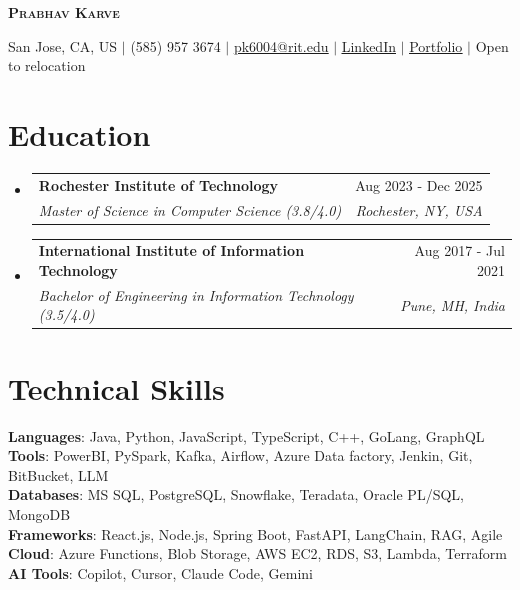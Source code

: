 \documentclass[letterpaper,10pt]{article}
\makeatletter
\newcommand{\resumeSubheading}[4]{
  \vspace{-2pt}\item
    \begin{tabular*}{0.97\textwidth}[t]{l@{\extracolsep{\fill}}r}
      \textbf{#1} & #2 \\
      \textit{\small#3} & \textit{\small #4} \\
    \end{tabular*}
}
\newcommand{\resumeSubHeadingListStart}{\begin{itemize}[leftmargin=0.15in, label={}]}
\newcommand{\resumeSubHeadingListEnd}{\end{itemize}}
\makeatother
\begin{document}
\begin{center}
\vspace{-20pt}
    \textbf{\Large \scshape Prabhav Karve} \\ \vspace{1pt}
    
    \small {San Jose, CA, US} $|$ (585) 957 3674 $|$ \href{mailto:pk6004@g.rit.edu}{{\underline{pk6004@rit.edu}}} $|$ 
    \href{https://www.linkedin.com/in/prabhav-karve-11300a145/}{{\underline{LinkedIn}}} $|$
    \href{https://prabhav-karve-portfolio2-0.vercel.app/}{{\underline{Portfolio}}} $|$
    {Open to relocation }
\vspace{-3pt}
\end{center}


\section{Education}
  \resumeSubHeadingListStart
    \resumeSubheading
      {Rochester Institute of Technology}{Aug 2023 - Dec 2025}
      {Master of Science in Computer Science (3.8/4.0)}{Rochester, NY, USA}
      {}
      \vspace{-5pt}
      \resumeSubheading
       {International Institute of Information Technology }{Aug 2017 - Jul 2021}
      {Bachelor of Engineering in Information Technology (3.5/4.0)}{Pune, MH, India}
      {}
      \vspace{-6pt}
  \resumeSubHeadingListEnd



\section{Technical Skills}
 \begin{itemize}[leftmargin=0.15in, label={}]
   \small{\item{
     \textbf{Languages}{: Java, Python, JavaScript, TypeScript, C++, GoLang, GraphQL} \\
     \textbf{Tools}{: PowerBI, PySpark, Kafka, Airflow, Azure Data factory, Jenkin, Git, BitBucket, LLM} \\
     \textbf{Databases}{: MS SQL, PostgreSQL, Snowflake, Teradata, Oracle PL/SQL, MongoDB}\\
     \textbf{Frameworks}{: React.js, Node.js, Spring Boot, FastAPI, LangChain, RAG, Agile } \\
     \textbf{Cloud}{: Azure Functions, Blob Storage, AWS EC2, RDS, S3, Lambda, Terraform} \\
     \textbf{AI Tools}{: Copilot, Cursor, Claude Code, Gemini } 
    }}
    
 \end{itemize}
\end{document}
